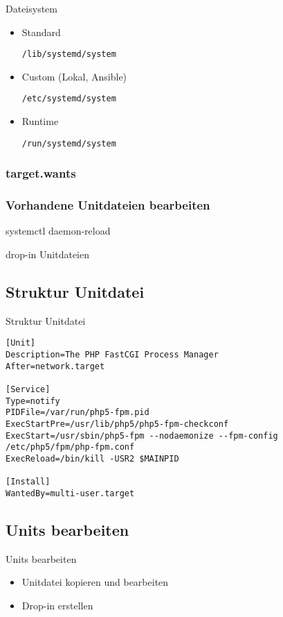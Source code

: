 \begin{frame}[fragile]{Dateisystem}
  \begin{itemize}
\item Standard

	\verb|/lib/systemd/system|
\item Custom (Lokal, Ansible)

	\verb|/etc/systemd/system|

\item Runtime

	\verb|/run/systemd/system|
\end{itemize}
\end{frame}

\subsubsection{target.wants}

\subsubsection{Vorhandene Unitdateien bearbeiten}


 systemctl daemon-reload

 drop-in Unitdateien
 \subsection{Struktur Unitdatei}

\begin{frame}[fragile]{Struktur Unitdatei}
 \begin{lstlisting}
[Unit]
Description=The PHP FastCGI Process Manager
After=network.target

[Service]
Type=notify
PIDFile=/var/run/php5-fpm.pid
ExecStartPre=/usr/lib/php5/php5-fpm-checkconf
ExecStart=/usr/sbin/php5-fpm --nodaemonize --fpm-config /etc/php5/fpm/php-fpm.conf
ExecReload=/bin/kill -USR2 $MAINPID

[Install]
WantedBy=multi-user.target
\end{lstlisting}
\end{frame}

\subsection{Units bearbeiten}
\begin{frame}{Units bearbeiten}
  \begin{itemize}
    \item Unitdatei kopieren und bearbeiten
    \item Drop-in erstellen
  \end{itemize}
\end{frame}

